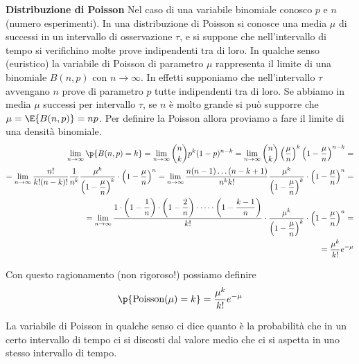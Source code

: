 \begin{defn}
    \textbf{Distribuzione di Poisson}
    Nel caso di una variabile binomiale conosco $ p $ e $ n $ (numero
    esperimenti). In una distribuzione di Poisson si conosce una media $ \mu $
    di successi in un intervallo di osservazione $ \tau $, e si suppone che
    nell'intervallo di tempo si verifichino molte prove indipendenti tra di
    loro. In qualche senso (euristico) la variabile di Poisson di parametro
    $\mu$ rappresenta il limite di una binomiale $B(n,p)$ con $n\rightarrow
    \infty$. In effetti supponiamo che nell'intervallo $ \tau $ avvengano $ n $
    prove di parametro $p$ tutte indipendenti tra di loro. Se abbiamo in media $
    \mu $ successi per intervallo $\tau$, se $n$ \`e molto grande si pu\`o
    supporre che $ \mu = \E{B(n,p)} = np$. Per definire la Poisson allora
    proviamo a fare il limite di una densit\`a binomiale.
    \begin{equation*}
    \begin{aligned}
        \lim_{n\rightarrow\infty}\p{B(n,p) = k} =\lim_{n\rightarrow\infty} \binom{n}{k}p^k(1-p)^{n-k}
        = \lim_{n\rightarrow\infty} \binom{n}{k} \left(\dfrac{\mu}{n}\right)^k \left(1- \dfrac{\mu}{n}\right)^{n-k}
        = \\
        =\lim_{n\rightarrow\infty}\dfrac{n!}{k!(n-k)!} \dfrac{1}{n^k} \dfrac{\mu^k}{\left(1-\dfrac{\mu}{n}\right)^k} \cdot \left(1-\dfrac{\mu}{n}\right)^n  =
        \lim_{n\rightarrow\infty}\dfrac{n(n-1)\dots (n-k+1)}{n^k k!} \dfrac{\mu^k}{\left(1-\dfrac{\mu}{n}\right)^k} \cdot \left(1-\dfrac{\mu}{n}\right)^n
        = \\
        =\lim_{n\rightarrow\infty} \dfrac{1 \cdot \left(1-\dfrac{1}{n} \right) \cdot \left(1-\dfrac{2}{n}\right) \cdot \dots \cdot \left(1- \dfrac{k-1}{n}\right)}{k!} \cdot \dfrac{\mu^k}{\left(1-\dfrac{\mu}{n}\right)^k} \cdot \left(1-\dfrac{\mu}{n}\right)^n =\\
        = \dfrac{\mu^k}{k!} e^{-\mu}
    \end{aligned}
    \end{equation*}

	Con questo ragionamento (non rigoroso!) possiamo definire
    \begin{equation}
    \p{\text{Poisson}(\mu) = k} = \dfrac{\mu^k}{k!} e^{-\mu}
    \end{equation}

\end{defn}

La variabile di Poisson in qualche senso ci dice quanto \`e la probabilit\`a che
in un certo intervallo di tempo ci si discosti dal valore medio che ci si
aspetta in uno stesso intervallo di tempo.

